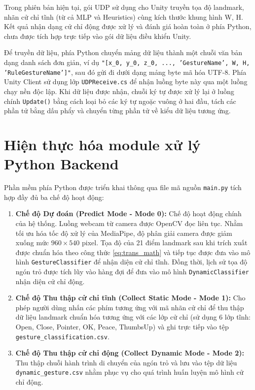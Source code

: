 \documentclass[../BTL.tex]{subfiles}
\begin{document}
Trong phiên bản hiện tại, gói UDP sử dụng cho Unity truyền tọa độ landmark, nhãn cử chỉ tĩnh (từ cả MLP và Heuristics) cùng kích thước khung hình W, H. Kết quả nhận dạng cử chỉ động được xử lý và đánh giá hoàn toàn ở phía Python, chưa được tích hợp trực tiếp vào gói dữ liệu điều khiển Unity.

Để truyền dữ liệu, phía Python chuyển mảng dữ liệu thành một chuỗi văn bản dạng danh sách đơn giản, ví dụ \texttt{"[x\_0, y\_0, z\_0, ..., 'GestureName', W, H, 'RuleGestureName']"}, sau đó gửi đi dưới dạng mảng byte mã hóa UTF-8. Phía Unity Client sử dụng lớp \texttt{UDPReceive.cs} để nhận luồng byte này qua một luồng chạy nền độc lập. Khi dữ liệu được nhận, chuỗi ký tự được xử lý lại ở luồng chính \texttt{Update()} bằng cách loại bỏ các ký tự ngoặc vuông ở hai đầu, tách các phần tử bằng dấu phẩy và chuyển từng phần tử về kiểu dữ liệu tương ứng.

\section{Hiện thực hóa module xử lý Python Backend}
\label{section:3.2}
Phần mềm phía Python được triển khai thông qua file mã nguồn \texttt{main.py} tích hợp đầy đủ ba chế độ hoạt động:
\begin{enumerate}
    \item \textbf{Chế độ Dự đoán (Predict Mode - Mode 0):} Chế độ hoạt động chính của hệ thống. Luồng webcam từ camera được OpenCV đọc liên tục. Nhằm tối ưu hóa tốc độ xử lý của MediaPipe, độ phân giải camera được giảm xuống mức $960 \times 540$ pixel. Tọa độ của 21 điểm landmark sau khi trích xuất được chuẩn hóa theo công thức \eqref{eq:trans_math} và tiếp tục được đưa vào mô hình \texttt{GestureClassifier} để nhận diện cử chỉ tĩnh. Đồng thời, lịch sử tọa độ ngón trỏ được tích lũy vào hàng đợi để đưa vào mô hình \texttt{DynamicClassifier} nhận diện cử chỉ động.
    \item \textbf{Chế độ Thu thập cử chỉ tĩnh (Collect Static Mode - Mode 1):} Cho phép người dùng nhấn các phím tương ứng với mã nhãn cử chỉ để thu thập dữ liệu landmark chuẩn hóa tương ứng với các lớp cử chỉ (sử dụng 6 lớp tĩnh: Open, Close, Pointer, OK, Peace, ThumbsUp) và ghi trực tiếp vào tệp \texttt{gesture\_classification.csv}.
    \item \textbf{Chế độ Thu thập cử chỉ động (Collect Dynamic Mode - Mode 2):} Thu thập chuỗi hành trình di chuyển của ngón trỏ và lưu vào tệp dữ liệu \texttt{dynamic\_gesture.csv} nhằm phục vụ cho quá trình huấn luyện mô hình cử chỉ động.
\end{enumerate}
\end{document}
